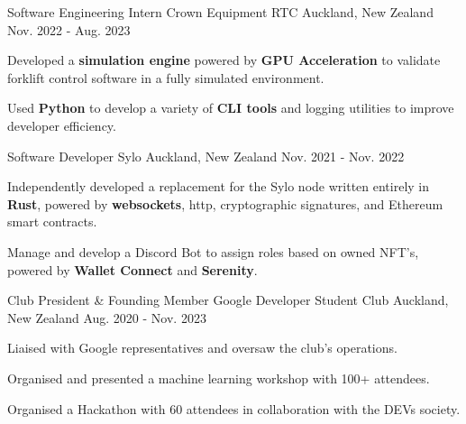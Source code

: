 \begin{cventries}
{\begin{cvitems}
      \end{cvitems}
    }

  \cventry
    {Software Engineering Intern}
    {Crown Equipment RTC}
    {Auckland, New Zealand}
    {Nov. 2022 - Aug. 2023}
    {
      \begin{cvitems}
        \item {Developed a \textbf{simulation engine} powered by \textbf{GPU Acceleration} to validate forklift control software in a fully simulated environment.}
        \item {Used \textbf{Python} to develop a variety of \textbf{CLI tools} and logging utilities to improve developer efficiency.}
      \end{cvitems}
    }

  \cventry
    {Software Developer} %
    {Sylo} %
    {Auckland, New Zealand} %
    {Nov. 2021 - Nov. 2022} %
    {
      \begin{cvitems} %
        \item {Independently developed a replacement for the Sylo node written entirely in \textbf{Rust}, powered by \textbf{websockets}, http, cryptographic signatures, and Ethereum smart contracts.}
        \item {Manage and develop a Discord Bot to assign roles based on owned NFT's, powered by \textbf{Wallet Connect} and \textbf{Serenity}.}
      \end{cvitems}
    }

  \cventry
    {Club President \& Founding Member} %
    {Google Developer Student Club} %
    {Auckland, New Zealand} %
    {Aug. 2020 - Nov. 2023} %
    {
      \begin{cvitems} %
        \item {Liaised with Google representatives and oversaw the club's operations.}
        \item {Organised and presented a machine learning workshop with 100+ attendees.}
        \item {Organised a Hackathon with 60 attendees in collaboration with the DEVs society.}
      \end{cvitems}
    }


\end{cventries}
